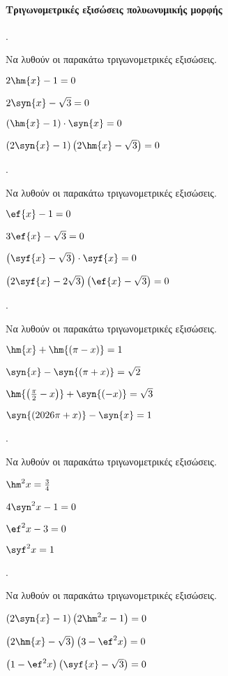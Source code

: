 \documentclass[11pt,a4paper,twocolumn]{article}
\newcounter{askhsh}
\newcommand{\askhsh}{\large\theaskhsh.\ \addtocounter{askhsh}{1}}
\begin{document}
\paragraph{Τριγωνομετρικές εξισώσεις πολυωνυμικής μορφής}
\askhsh 
Να λυθούν οι παρακάτω τριγωνομετρικές εξισώσεις.
\begin{alist}
\item $ 2\hm{x}-1=0 $
\item $ 2\syn{x}-\sqrt{3}=0 $
\item $ (\hm{x}-1)\cdot\syn{x}=0 $
\item $ (2\syn{x}-1)\left( 2\hm{x}-\sqrt{3}\right) =0 $
\end{alist}
\askhsh 
Να λυθούν οι παρακάτω τριγωνομετρικές εξισώσεις.
\begin{alist}
\item $ \ef{x}-1=0 $
\item $ 3\ef{x}-\sqrt{3}=0 $
\item $ \left( \syf{x}-\sqrt{3}\right) \cdot\syf{x}=0 $
\item $ \left( 2\syf{x}-2\sqrt{3}\right) \left( \ef{x}-\sqrt{3}\right) =0 $
\end{alist}
\askhsh 
Να λυθούν οι παρακάτω τριγωνομετρικές εξισώσεις.
\begin{alist}
\item $ \hm{x}+\hm{(\pi-x)}=1 $
\item $ \syn{x}-\syn{(\pi+x)}=\sqrt{2} $
\item $ \hm{\left( \frac{\pi}{2}-x\right) }+\syn{(-x)}=\sqrt{3} $
\item $ \syn{\left(\the\year\pi+x \right) }-\syn{x}=1 $
\end{alist}
\askhsh 
Να λυθούν οι παρακάτω τριγωνομετρικές εξισώσεις.
\begin{alist}
\item $ \hm^2{x}=\frac{3}{4} $
\item $ 4\syn^2{x}-1=0 $
\item $ \ef^2{x}-3=0 $
\item $ \syf^2{x}=1 $
\end{alist}
\askhsh Να λυθούν οι παρακάτω τριγωνομετρικές εξισώσεις.
\begin{alist}
\item $ \left(2\syn{x}-1\right)\left( 2\hm^2{x}-1\right)=0 $
\item $ \left(2\hm{x}-\sqrt{3}\right)\left(3-\ef^2{x}\right)=0  $
\item $ \left( 1-\ef^2{x}\right)\left( \syf{x}-\sqrt{3}\right)=0  $
\end{alist}
\end{document}
